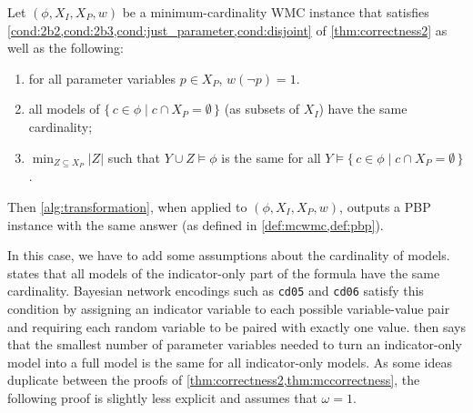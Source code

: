 \begin{theorem}\label{thm:mccorrectness}
  Let $(\phi, X_I, X_P, w)$ be a minimum-cardinality WMC instance that satisfies
  \cref{cond:2b2,cond:2b3,cond:just_parameter,cond:disjoint} of
  \cref{thm:correctness2} as well as the following:
  \begin{enumerate}
    \item for all parameter variables $p \in X_P$, $w(\neg p) = 1$.
    \item all models of $\{\, c \in \phi \mid c \cap X_P = \emptyset \,\}$ (as
          subsets of $X_I$) have the same cardinality;\label{cond:22}
    \item $\min_{Z \subseteq X_P} |Z|$ such that $Y \cup Z \models \phi$ is the
          same for all
          $Y \models \{\, c \in \phi \mid c \cap X_P = \emptyset \,\}$.\label{cond:23}
  \end{enumerate}
  Then \cref{alg:transformation}, when applied to $(\phi, X_I, X_P, w)$, outputs
  a PBP instance with the same answer (as defined in \cref{def:mcwmc,def:pbp}).
\end{theorem}

In this case, we have to add some assumptions about the cardinality of models.
 states that all models of the indicator-only part of the formula
have the same cardinality. Bayesian network encodings such as \texttt{cd05} and
\texttt{cd06} satisfy this condition by assigning an indicator variable to each
possible variable-value pair and requiring each random variable to be paired
with exactly one value.  then says that the smallest number of
parameter variables needed to turn an indicator-only model into a full model is
the same for all indicator-only models. As some ideas duplicate between the
proofs of \cref{thm:correctness2,thm:mccorrectness}, the following proof is
slightly less explicit and assumes that $\omega = 1$.

